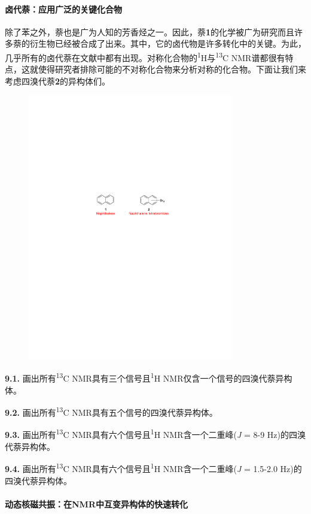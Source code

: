\paragraph{卤代萘：应用广泛的关键化合物}

除了苯之外，萘也是广为人知的芳香烃之一。因此，萘\textbf{1}的化学被广为研究而且许多萘的衍生物已经被合成了出来。其中，它的卤代物是许多转化中的关键。为此，几乎所有的卤代萘在文献中都有出现。对称化合物的\textsuperscript{1}H与\textsuperscript{13}C
NMR谱都很有特点，这就使得研究者排除可能的不对称化合物来分析对称的化合物。下面让我们来考虑四溴代萘\textbf{2}的异构体们。

\begin{figure}[h]
	\centering
	\includegraphics[width=9cm]{./pic/t9-1.pdf}
\end{figure}


\noindent\textbf{9.1.} 画出所有\textsuperscript{13}C
NMR具有三个信号且\textsuperscript{1}H NMR仅含一个信号的四溴代萘异构体。

\noindent\textbf{9.2.} 画出所有\textsuperscript{13}C
NMR具有五个信号的四溴代萘异构体。

\noindent\textbf{9.3.} 画出所有\textsuperscript{13}C
NMR具有六个信号且\textsuperscript{1}H NMR含一个二重峰(\emph{J} = 8-9
Hz)的四溴代萘异构体。

\noindent\textbf{9.4.} 画出所有\textsuperscript{13}C
NMR具有六个信号且\textsuperscript{1}H NMR含一个二重峰(\emph{J} = 1.5-2.0
Hz)的四溴代萘异构体。

\paragraph{动态核磁共振：在NMR中互变异构体的快速转化}

